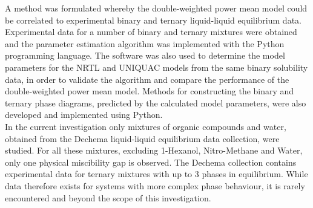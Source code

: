 A method was formulated whereby the double-weighted power mean model could be correlated to experimental binary and ternary liquid-liquid equilibrium data. Experimental data for a number of binary and ternary mixtures were obtained and the parameter estimation algorithm was implemented with the Python programming language. The software was also used to determine the model parameters for the NRTL and UNIQUAC models from the same binary solubility data, in order to validate the algorithm and compare the performance of the double-weighted power mean model. Methods for constructing the binary and ternary phase diagrams, predicted by the calculated model parameters, were also developed and implemented using Python.\\

In the current investigation only mixtures of organic compounds and water, obtained from the Dechema liquid-liquid equilibrium data collection, were studied. For all these mixtures, excluding 1-Hexanol, Nitro-Methane and Water, only one physical miscibility gap is observed. The Dechema collection contains experimental data for ternary mixtures with up to 3 phases in equilibrium. While data therefore exists for systems with more complex phase behaviour, it is rarely encountered and beyond the scope of this investigation.\\

